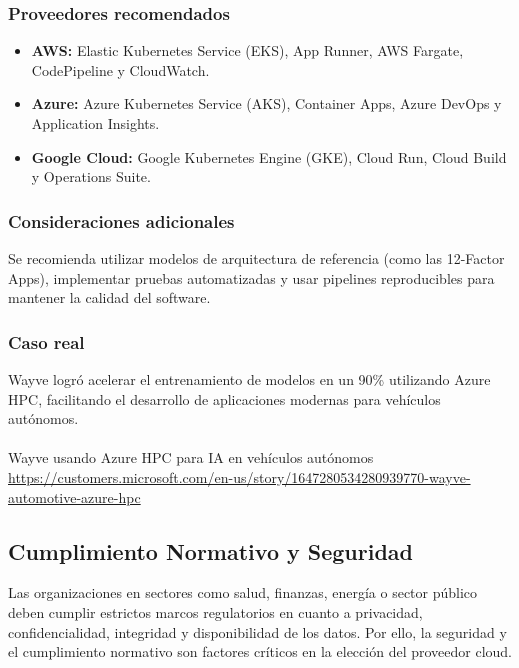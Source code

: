 {            \subsubsection{Proveedores recomendados}
                \begin{itemize}
                    \item \textbf{AWS:} Elastic Kubernetes Service (EKS), App Runner, AWS Fargate, CodePipeline y CloudWatch.
                    \item \textbf{Azure:} Azure Kubernetes Service (AKS), Container Apps, Azure DevOps y Application Insights.
                    \item \textbf{Google Cloud:} Google Kubernetes Engine (GKE), Cloud Run, Cloud Build y Operations Suite.
                \end{itemize}
            
            \subsubsection{Consideraciones adicionales}
                Se recomienda utilizar modelos de arquitectura de referencia (como las 12-Factor Apps), implementar pruebas automatizadas y usar pipelines reproducibles para mantener la calidad del software.
                
            \subsubsection{Caso real}
                Wayve logró acelerar el entrenamiento de modelos en un 90\% utilizando Azure HPC, facilitando el desarrollo de aplicaciones modernas para vehículos autónomos.

                \paragraph{} Wayve usando Azure HPC para IA en vehículos autónomos \href{https://customers.microsoft.com/en-us/story/1647280534280939770-wayve-automotive-azure-hpc}{https://customers.microsoft.com/en-us/story/1647280534280939770-wayve-automotive-azure-hpc}
                
        \subsection{Cumplimiento Normativo y Seguridad}
            Las organizaciones en sectores como salud, finanzas, energía o sector público deben cumplir estrictos marcos regulatorios en cuanto a privacidad, confidencialidad, integridad y disponibilidad de los datos. Por ello, la seguridad y el cumplimiento normativo son factores críticos en la elección del proveedor cloud.
                
}

